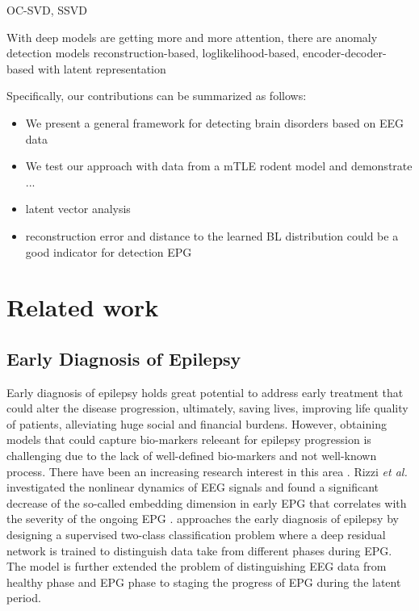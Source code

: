 \documentclass{article}
\begin{document}
	
	OC-SVD, SSVD
	
	
	With deep models are getting more and more attention, there are anomaly detection models 
	reconstruction-based,
	loglikelihood-based,
	encoder-decoder-based with latent representation
	
	
	Specifically, our contributions can be summarized as follows:
	\begin{itemize}
		\item We present a general framework for detecting brain disorders based on EEG data
		\item We test our approach with data from a mTLE rodent model and demonstrate ... 
		\item latent vector analysis 
		\item reconstruction error and distance to the learned BL distribution could be a good indicator for detection EPG
	\end{itemize}
	
	
	
	\section{Related work}
	\subsection{Early Diagnosis of Epilepsy}
	Early diagnosis of epilepsy holds great potential to address early treatment that could alter the disease progression, ultimately, saving lives, improving life quality of patients, alleviating huge social and financial burdens. However, obtaining models that could capture bio-markers releeant for epilepsy progression is challenging due to the lack of well-defined bio-markers and not well-known process. There have been an increasing research interest in this area \cite{lu2020towards, lu2020staging, rizzi2019changes}. Rizzi \textit{et al.} investigated the nonlinear dynamics of EEG signals and found a significant decrease of the so-called embedding dimension in early EPG that correlates with the severity of the ongoing EPG \cite{rizzi2019changes}.
	\cite{lu2020towards} approaches the early diagnosis of epilepsy by designing a supervised two-class classification problem where a deep residual network is trained to distinguish data take from different phases during EPG. The model is 
	\cite{lu2020staging} further extended the problem of distinguishing EEG data from healthy phase and EPG phase to staging the progress of EPG during the latent period.
	
\end{document}
